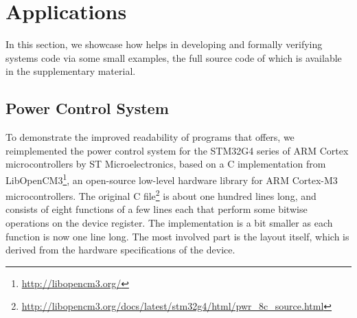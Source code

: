 \section{Applications}
\label{sec:applications}



In this section, we showcase how \Dargent helps in developing and formally
verifying systems code via some small examples, the full source code of which is available in the supplementary material.
 


\subsection{Power Control System}\label{ssec:power-control-system}

To demonstrate the improved readability of programs that \Dargent offers, 
we reimplemented the power control 
system for the STM32G4 series of ARM Cortex
microcontrollers by ST Microelectronics, based on a C implementation
from LibOpenCM3\footnote{\url{http://libopencm3.org/}}, an open-source low-level
hardware library for ARM Cortex-M3 microcontrollers.
The original C file\footnote{\url{http://libopencm3.org/docs/latest/stm32g4/html/pwr_8c_source.html}}
is about one hundred lines long, and consists of eight functions of a few lines
each that perform some bitwise operations on the device register. 
The \cogent implementation is a bit smaller as each function is now one line long. The
most involved part is the \dargent layout itself, which is derived from the hardware specifications of the device.

